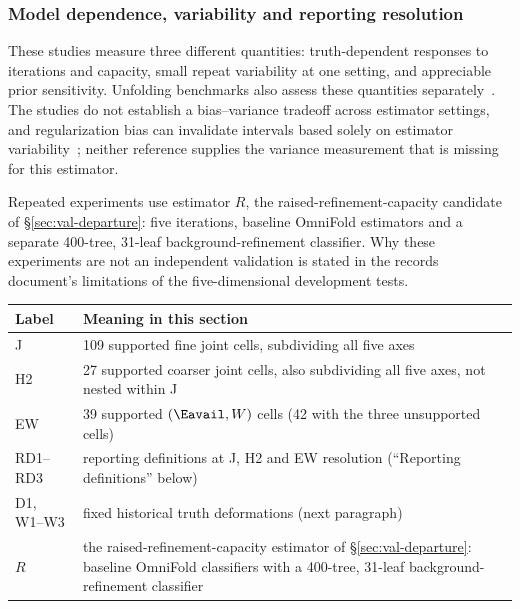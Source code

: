 \subsubsection{Model dependence, variability and reporting resolution}
\label{sec:gbdt-model-dependence}

These studies measure three different quantities: truth-dependent responses to iterations and capacity, small repeat variability at one setting, and appreciable prior sensitivity. Unfolding benchmarks also assess these quantities separately~\cite{Brenner2020Unfolding}. The studies do not establish a bias--variance tradeoff across estimator settings, and regularization bias can invalidate intervals based solely on estimator variability~\cite{Kuusela2015Unfolding}; neither reference supplies the variance measurement that is missing for this estimator.

Repeated experiments use estimator $R$, the raised-refinement-capacity candidate of \S\ref{sec:val-departure}: five iterations, baseline OmniFold estimators and a separate 400-tree, 31-leaf background-refinement classifier. Why these experiments are not an independent validation is stated in the records document's limitations of the five-dimensional development tests.

\begin{center}
\small
\begin{tabular}{@{}lp{}@{}}
\toprule
Label & Meaning in this section \\
\midrule
J & 109 supported fine joint cells, subdividing all five axes \\
H2 & 27 supported coarser joint cells, also subdividing all five axes, not nested within J \\
EW & 39 supported $(\Eavail,W)$ cells (42 with the three unsupported cells) \\
RD1--RD3 & reporting definitions at J, H2 and EW resolution (``Reporting definitions'' below) \\
D1, W1--W3 & fixed historical truth deformations (next paragraph) \\
$R$ & the raised-refinement-capacity estimator of \S\ref{sec:val-departure}: baseline OmniFold classifiers with a 400-tree, 31-leaf background-refinement classifier \\
\bottomrule
\end{tabular}
\end{center}

